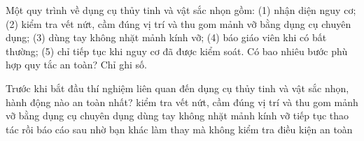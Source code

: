 \begin{ex}
Một quy trình về dụng cụ thủy tinh và vật sắc nhọn gồm: (1) nhận diện nguy cơ; (2) kiểm tra vết nứt, cầm đúng vị trí và thu gom mảnh vỡ bằng dụng cụ chuyên dụng; (3) dùng tay không nhặt mảnh kính vỡ; (4) báo giáo viên khi có bất thường; (5) chỉ tiếp tục khi nguy cơ đã được kiểm soát. Có bao nhiêu bước phù hợp quy tắc an toàn? Chỉ ghi số.
\end{ex}

\begin{ex}
Trước khi bắt đầu thí nghiệm liên quan đến dụng cụ thủy tinh và vật sắc nhọn, hành động nào an toàn nhất?
\choice
{\True kiểm tra vết nứt, cầm đúng vị trí và thu gom mảnh vỡ bằng dụng cụ chuyên dụng}
{dùng tay không nhặt mảnh kính vỡ}
{tiếp tục thao tác rồi báo cáo sau}
{nhờ bạn khác làm thay mà không kiểm tra điều kiện an toàn}
\end{ex}

